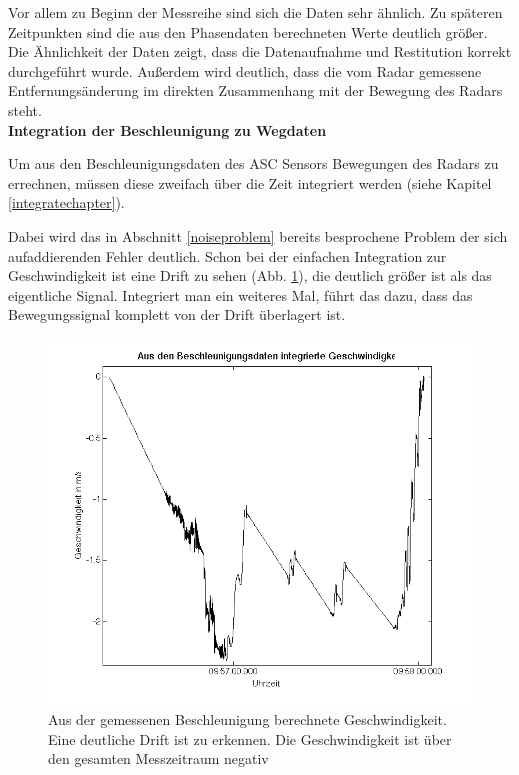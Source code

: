 \documentclass[12pt,a4paper,twoside,BCOR=12.5mm]{scrartcl}
\begin{document}
Vor allem zu Beginn der Messreihe sind sich die Daten sehr ähnlich. Zu späteren Zeitpunkten sind die aus den Phasendaten berechneten Werte deutlich größer.\\

Die Ähnlichkeit der Daten zeigt, dass die Datenaufnahme und Restitution korrekt durchgeführt wurde. Außerdem wird deutlich, dass die vom Radar gemessene Entfernungsänderung im direkten Zusammenhang mit der Bewegung des Radars steht.\\


\textbf{Integration der Beschleunigung zu Wegdaten}

Um aus den Beschleunigungsdaten des ASC Sensors Bewegungen  des Radars zu errechnen, müssen diese zweifach über die Zeit integriert werden (siehe Kapitel \ref{integratechapter}).

Dabei wird das in Abschnitt \ref{noiseproblem} bereits besprochene Problem der sich aufaddierenden Fehler deutlich.
Schon bei der einfachen Integration zur Geschwindigkeit ist eine Drift zu sehen (Abb. \ref{v_trend}), die deutlich größer ist als das eigentliche Signal. Integriert man ein weiteres Mal, führt das dazu, dass das Bewegungssignal komplett von der Drift überlagert ist. 

 \begin{figure}[htb]
\includegraphics[scale=.6]{geoauswertung/v_trend.png}
\caption{Aus der gemessenen Beschleunigung berechnete Geschwindigkeit. Eine deutliche Drift ist zu erkennen. Die Geschwindigkeit ist über den gesamten Messzeitraum negativ}
\label{v_trend}
\end{figure}
\end{document}
